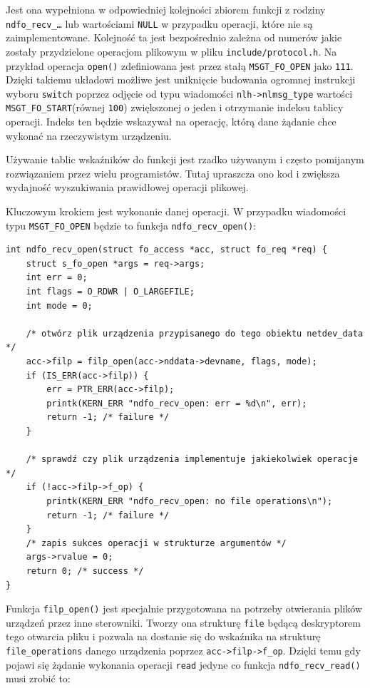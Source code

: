 \documentclass[11pt]{scrartcl}
\begin{document}
Jest ona wypełniona w odpowiedniej kolejności zbiorem funkcji z rodziny \newline\texttt{ndfo\_recv\_\ldots} lub wartościami \texttt{NULL} w przypadku operacji, które nie są zaimplementowane. Kolejność ta jest bezpośrednio zależna od numerów jakie zostały przydzielone operacjom plikowym w pliku \texttt{include/protocol.h}. Na przykład operacja \texttt{open()} zdefiniowana jest przez stałą \texttt{MSGT\_FO\_OPEN} jako \texttt{111}.  Dzięki takiemu układowi możliwe jest uniknięcie budowania ogromnej instrukcji wyboru \texttt{switch} poprzez odjęcie od typu wiadomości \texttt{nlh-\textgreater{}nlmsg\_type} wartości \texttt{MSGT\_FO\_START}(równej \texttt{100}) zwiększonej o jeden i otrzymanie indeksu tablicy operacji. Indeks ten będzie wskazywał na operację, którą dane żądanie chce wykonać na rzeczywistym urządzeniu.

Używanie tablic wskaźników do funkcji jest rzadko używanym i często pomijanym rozwiązaniem przez wielu programistów. Tutaj upraszcza ono kod i zwiększa wydajność wyszukiwania prawidłowej operacji plikowej.

Kluczowym krokiem jest wykonanie danej operacji. W przypadku wiadomości typu \texttt{MSGT\_FO\_OPEN} będzie to funkcja \texttt{ndfo\_recv\_open()}:

\newpage
\begin{verbatim}
int ndfo_recv_open(struct fo_access *acc, struct fo_req *req) {
    struct s_fo_open *args = req->args;
    int err = 0;
    int flags = O_RDWR | O_LARGEFILE;
    int mode = 0;

    /* otwórz plik urządzenia przypisanego do tego obiektu netdev_data */
    acc->filp = filp_open(acc->nddata->devname, flags, mode);
    if (IS_ERR(acc->filp)) {
        err = PTR_ERR(acc->filp);
        printk(KERN_ERR "ndfo_recv_open: err = %d\n", err);
        return -1; /* failure */
    }

    /* sprawdź czy plik urządzenia implementuje jakiekolwiek operacje */
    if (!acc->filp->f_op) {
        printk(KERN_ERR "ndfo_recv_open: no file operations\n");
        return -1; /* failure */
    }
    /* zapis sukces operacji w strukturze argumentów */
    args->rvalue = 0;
    return 0; /* success */
}
\end{verbatim}

Funkcja \texttt{filp\_open()} jest specjalnie przygotowana na potrzeby otwierania plików urządzeń przez inne sterowniki. Tworzy ona strukturę \texttt{file} będącą deskryptorem tego otwarcia pliku i pozwala na dostanie się do wskaźnika na strukturę \texttt{file\_operations} danego urządzenia poprzez \texttt{acc-\textgreater{}filp-\textgreater{}f\_op}.  Dzięki temu gdy pojawi się żądanie wykonania operacji \texttt{read} jedyne co funkcja \texttt{ndfo\_recv\_read()} musi zrobić to:
\end{document}

